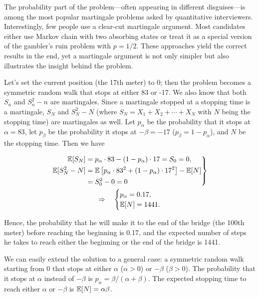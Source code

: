 \begin{solution}
The probability part of the problem---often appearing in different disguises---is among
the most popular martingale problems asked by quantitative interviewers. Interestingly,
few people use a clear-cut martingale argument. Most candidates either use Markov chain
with two absorbing states or treat it as a special version of the gambler's ruin problem
with $p=1/2$. These approaches yield the correct results in the end, yet a martingale
argument is not only simpler but also illustrates the insight behind the problem.


Let's set the current position (the 17th meter) to 0; then the problem becomes a symmetric
random walk that stops at either 83 or -17. We also know that both $S_n$ and $S_n^2-n$
are martingales. Since a martingale stopped at a stopping time is a martingale, $S_N$ and
$S_N^2-N$ (where $S_N=X_1+X_2+\cdots+X_N$ with $N$ being the stopping time) are
martingales as well. Let $p_\alpha$ be the probability that it stops at $\alpha=83$, let
$p_\beta$ be the probability it stops at $-\beta=-17$ ($p_\beta=1-p_\alpha$), and $N$
be the stopping time. Then we have

\[
\begin{gathered}
\left.\begin{aligned}
\mathbb{E}[S_N]&=p_\alpha\cdot83-(1-p_\alpha)\cdot17=S_0=0,\\
\mathbb{E}[S_N^2-N]&=\mathbb{E}\left[p_\alpha\cdot83^2+(1-p_\alpha)\cdot17^2\right]-\mathbb{E}[N]\\
&=S_0^2-0=0
\end{aligned}\right\}\\
\quad\Rightarrow\quad
\begin{cases}
p_\alpha=0.17,\\
\mathbb{E}[N]=1441.
\end{cases}
\end{gathered}
\]

Hence, the probability that he will make it to the end of the bridge (the 100th meter)
before reaching the beginning is 0.17, and the expected number of steps he takes to reach
either the beginning or the end of the bridge is 1441.

We can easily extend the solution to a general case: a symmetric random walk starting
from 0 that stops at either $\alpha$ ($\alpha>0$) or $-\beta$ ($\beta>0$). The probability
that it stops at $\alpha$ instead of $-\beta$ is $p_\alpha=\beta/(\alpha+\beta)$. The
expected stopping time to reach either $\alpha$ or $-\beta$ is $\mathbb{E}[N]=\alpha\beta$.

\end{solution}

